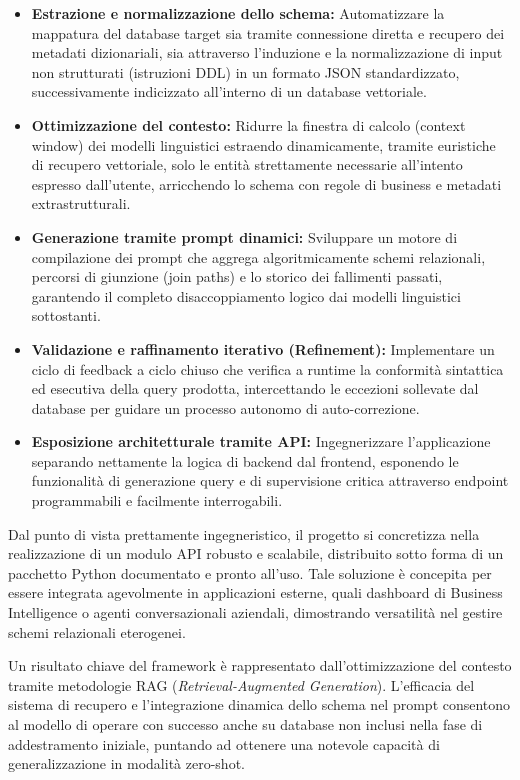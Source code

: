 \begin{itemize}
\item
  \textbf{Estrazione e normalizzazione dello schema:} Automatizzare la
  mappatura del database target sia tramite connessione diretta e
  recupero dei metadati dizionariali, sia attraverso l'induzione e la
  normalizzazione di input non strutturati (istruzioni DDL) in un
  formato JSON standardizzato, successivamente indicizzato all'interno
  di un database vettoriale.
\item
  \textbf{Ottimizzazione del contesto:} Ridurre la finestra di calcolo
  (context window) dei modelli linguistici estraendo
  dinamicamente, tramite euristiche di recupero vettoriale, solo le
  entità strettamente necessarie all'intento espresso dall'utente,
  arricchendo lo schema con regole di business e metadati
  extrastrutturali.
\item
  \textbf{Generazione tramite prompt dinamici:} Sviluppare un motore di
  compilazione dei prompt che aggrega algoritmicamente schemi
  relazionali, percorsi di giunzione (join paths) e lo storico
  dei fallimenti passati, garantendo il completo disaccoppiamento logico
  dai modelli linguistici sottostanti.
\item
  \textbf{Validazione e raffinamento iterativo (Refinement):}
  Implementare un ciclo di feedback a ciclo chiuso che verifica a
  runtime la conformità sintattica ed esecutiva della query prodotta,
  intercettando le eccezioni sollevate dal database per guidare un
  processo autonomo di auto-correzione.
\item
  \textbf{Esposizione architetturale tramite API:} Ingegnerizzare
  l'applicazione separando nettamente la logica di backend dal frontend,
  esponendo le funzionalità di generazione query e di supervisione
  critica attraverso endpoint programmabili e facilmente interrogabili.
\end{itemize}

Dal punto di vista prettamente ingegneristico, il progetto si
concretizza nella realizzazione di un modulo API robusto e scalabile,
distribuito sotto forma di un pacchetto Python documentato e pronto
all'uso. Tale soluzione è concepita per essere integrata agevolmente in
applicazioni esterne, quali dashboard di Business Intelligence o agenti
conversazionali aziendali, dimostrando versatilità nel gestire schemi
relazionali eterogenei.

Un risultato chiave del framework è rappresentato dall'ottimizzazione
del contesto tramite metodologie RAG (\emph{Retrieval-Augmented
Generation}). L'efficacia del sistema di recupero e l'integrazione
dinamica dello schema nel prompt consentono al modello di operare con
successo anche su database non inclusi nella fase di addestramento
iniziale, puntando ad ottenere una notevole capacità di generalizzazione in
modalità zero-shot.

